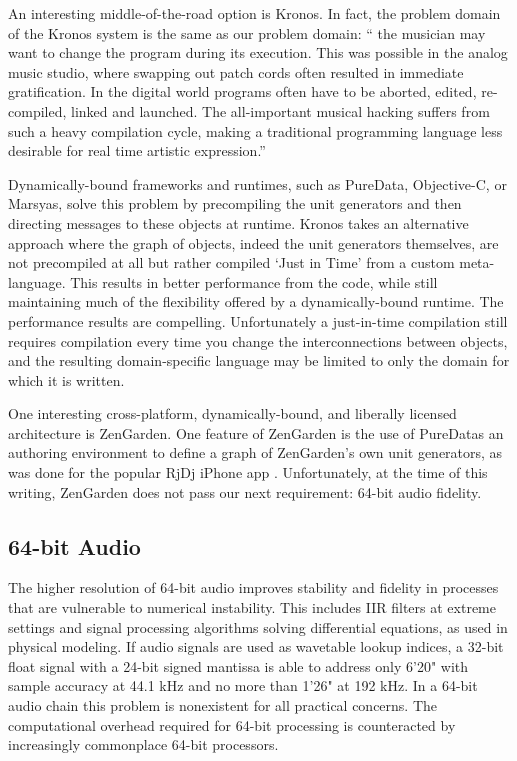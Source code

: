 \documentclass[twoside,10pt]{article}
\begin{document}

An interesting middle-of-the-road option is Kronos.  In fact, the problem domain of the Kronos system is the same as our problem domain: `` the musician may want to change the program during its execution. This was possible in the analog music studio, where swapping out patch cords often resulted in immediate gratification. In the digital world programs often have to be aborted, edited, re-compiled, linked and launched. The all-important musical hacking suffers from such a heavy compilation cycle, making a traditional programming language less desirable for real time artistic expression.'' \cite{Norilo:2009}

Dynamically-bound frameworks and runtimes, such as PureData, Objective-C, or Marsyas, solve this problem by precompiling the unit generators and then directing messages to these objects at runtime.  Kronos takes an alternative approach where the graph of objects, indeed the unit generators themselves, are not precompiled at all but rather compiled `Just in Time' from a custom meta-language. This results in better performance from the code, while still maintaining much of the flexibility offered by a dynamically-bound runtime.  The performance results are compelling.  Unfortunately a just-in-time compilation still requires compilation every time you change the interconnections between objects, and the resulting domain-specific language may be limited to only the domain for which it is written.

One interesting cross-platform, dynamically-bound, and liberally licensed architecture is ZenGarden\cite{web4}.  One feature of ZenGarden is the use of PureDatas an authoring environment to define a graph of ZenGarden's own unit generators, as was done for the popular RjDj iPhone app \cite{web5}.  Unfortunately, at the time of this writing, ZenGarden does not pass our next requirement: 64-bit audio fidelity.



\subsection{64-bit Audio} %

The higher resolution of 64-bit audio improves stability and fidelity in processes that are vulnerable to numerical instability.  This includes IIR filters at extreme settings and signal processing algorithms solving differential equations, as used in physical modeling.  If audio signals are used as wavetable lookup indices, a 32-bit float signal with a 24-bit signed mantissa is able to address only 6'20" with sample accuracy at 44.1 kHz and no more than 1'26" at 192 kHz. In a 64-bit audio chain this problem is nonexistent for all practical concerns. The computational overhead required for 64-bit processing is counteracted by increasingly commonplace 64-bit processors.
\end{document}
